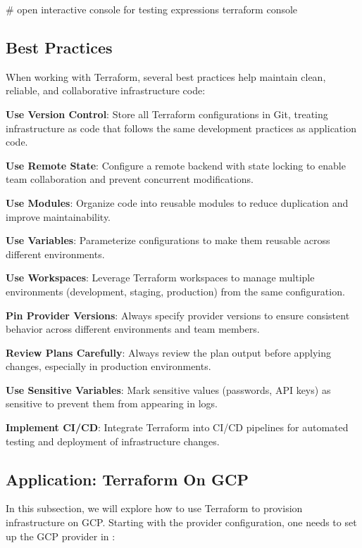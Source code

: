 \begin{bash}
# open interactive console for testing expressions
terraform console
\end{bash}

\subsection{Best Practices}

When working with Terraform, several best practices help maintain clean, reliable, and collaborative infrastructure
code:
\bit
\item \textbf{Use Version Control}: Store all Terraform configurations in Git, treating infrastructure as code that
follows the same development practices as application code.
\item \textbf{Use Remote State}: Configure a remote backend with state locking to enable team collaboration and prevent
concurrent modifications.
\item \textbf{Use Modules}: Organize code into reusable modules to reduce duplication and improve maintainability.
\item \textbf{Use Variables}: Parameterize configurations to make them reusable across different environments.
\item \textbf{Use Workspaces}: Leverage Terraform workspaces to manage multiple environments (development, staging,
production) from the same configuration.
\item \textbf{Pin Provider Versions}: Always specify provider versions to ensure consistent behavior across different
environments and team members.
\item \textbf{Review Plans Carefully}: Always review the plan output before applying changes, especially in production
environments.
\item \textbf{Use Sensitive Variables}: Mark sensitive values (passwords, API keys) as sensitive to prevent them from
appearing in logs.
\item \textbf{Implement CI/CD}: Integrate Terraform into CI/CD pipelines for automated testing and deployment of
infrastructure changes.
\eit

\subsection{Application: Terraform On GCP}

In this subsection, we will explore how to use Terraform to provision infrastructure on GCP. Starting with the provider
configuration, one needs to set up the GCP provider in :

